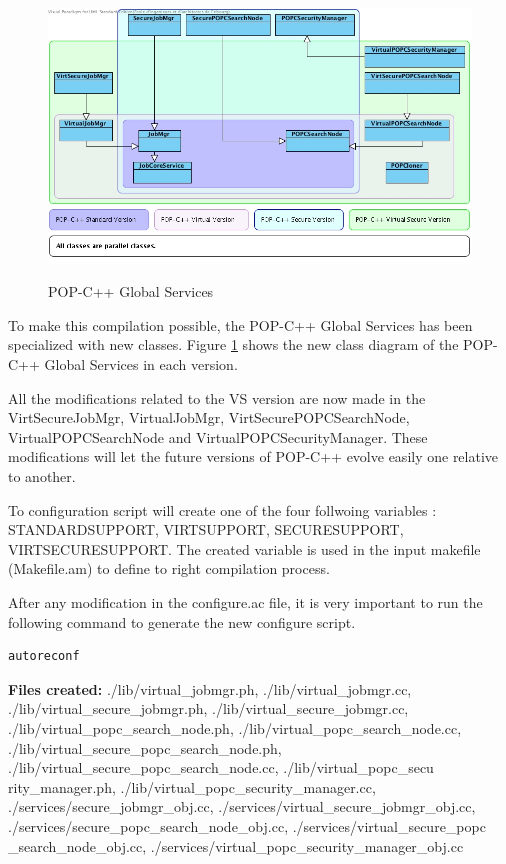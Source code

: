 \begin{figure}[ht]
	\caption{POP-C++ Global Services}
  	\centering
	\includegraphics[width=1.0\textwidth]{./pic/global_service_cd.jpg}
	\label{fig:global_service_cd}
\end{figure}

To make this compilation possible, the POP-C++ Global Services has been specialized with new classes. Figure \ref{fig:global_service_cd} shows the new class diagram of the POP-C++ Global Services in each version.\s

All the modifications related to the VS version are now made in the VirtSecureJobMgr, VirtualJobMgr, VirtSecurePOPCSearchNode, VirtualPOPCSearchNode and VirtualPOPCSecurityManager. These modifications will let the future versions of POP-C++ evolve easily one relative to another.\s

To configuration script will create one of the four follwoing variables : STANDARDSUPPORT, VIRTSUPPORT, SECURESUPPORT, VIRTSECURESUPPORT. The created variable is used in the input makefile (Makefile.am) to define to right compilation process. \s

After any modification in the configure.ac file, it is very important to run the following command to generate the new configure script. 
\begin{lstlisting}
autoreconf
\end{lstlisting}\s

\textbf{Files created:} ./lib/virtual\_jobmgr.ph, ./lib/virtual\_jobmgr.cc, ./lib/virtual\_secure\_jobmgr.ph, ./lib/virtual\_secure\_jobmgr.cc, ./lib/virtual\_popc\_search\_node.ph, ./lib/virtual\_popc\_search\_node.cc, ./lib/virtual\_secure\_popc\_search\_node.ph, ./lib/virtual\_secure\_popc\_search\_node.cc, ./lib/virtual\_popc\_secu rity\_manager.ph, ./lib/virtual\_popc\_security\_manager.cc,
 ./services/secure\_jobmgr\_obj.cc,  ./services/virtual\_secure\_jobmgr\_obj.cc,  ./services/secure\_popc\_search\_node\_obj.cc,  ./services/virtual\_secure\_popc \_search\_node\_obj.cc,  ./services/virtual\_popc\_security\_manager\_obj.cc \s

